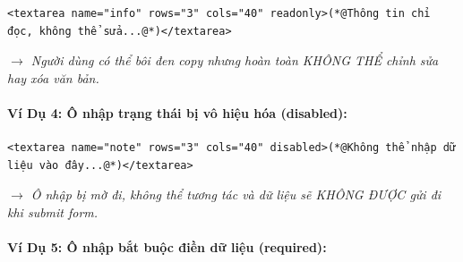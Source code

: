 \documentclass[11pt,oneside]{book}
\begin{document}
\begin{codeWindow}
\begin{lstlisting}[language=HTML5]
<textarea name="info" rows="3" cols="40" readonly>(*@Thông tin chỉ đọc, không thể sửa...@*)</textarea>
\end{lstlisting}
\end{codeWindow}

\begin{browserWindow}
\sffamily\small
{} \par\vspace{4pt}
\textcolor{codeComment}{\small\textit{$\rightarrow$ Người dùng có thể bôi đen copy nhưng hoàn toàn KHÔNG THỂ chỉnh sửa hay xóa văn bản.}}
\end{browserWindow}

\paragraph{Ví Dụ 4: Ô nhập trạng thái bị vô hiệu hóa (disabled):}

\begin{codeWindow}
\begin{lstlisting}[language=HTML5]
<textarea name="note" rows="3" cols="40" disabled>(*@Không thể nhập dữ liệu vào đây...@*)</textarea>
\end{lstlisting}
\end{codeWindow}

\begin{browserWindow}
\sffamily\small
{} \par\vspace{4pt}
\textcolor{codeComment}{\small\textit{$\rightarrow$ Ô nhập bị mờ đi, không thể tương tác và dữ liệu sẽ KHÔNG ĐƯỢC gửi đi khi submit form.}}
\end{browserWindow}

\paragraph{Ví Dụ 5: Ô nhập bắt buộc điền dữ liệu (required):}
\end{document}
